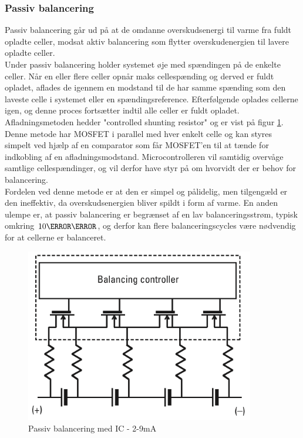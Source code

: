 \subsubsection{Passiv balancering}
Passiv balancering går ud på at de omdanne overskudsenergi til varme fra fuldt opladte celler, modsat aktiv balancering som flytter overskudenergien til lavere opladte celler.
\\

Under passiv balancering holder systemet øje med spændingen på de enkelte celler. Når en eller flere celler opnår maks cellespænding og derved er fuldt opladet, aflades de igennem en modstand til de har samme spænding som den laveste celle i systemet eller en spændingsreference. Efterfølgende oplades cellerne igen, og denne proces fortsætter indtil alle celler er fuldt opladet. 
\\

Afladningsmetoden hedder "controlled shunting resistor" og er vist på figur \ref{fig:passiv_balancering}. Denne metode har MOSFET i parallel med hver enkelt celle og kan styres simpelt ved hjælp af en comparator som får MOSFET'en til at tænde for indkobling af en afladningsmodstand. Microcontrolleren vil samtidig overvåge samtlige cellespændinger, og vil derfor have styr på om hvorvidt der er behov for balancering.
\\

Fordelen ved denne metode er at den er simpel og pålidelig, men tilgengæld er den ineffektiv, da overskudsenergien bliver spildt i form af varme. En anden ulempe er, at passiv balancering er  begrænset af en lav balanceringsstrøm, typisk omkring $10\milli\ampere$, og derfor kan flere balanceringscycles være nødvendig for at cellerne er balanceret.

\begin{figure}[h]
	\centering
	\includegraphics[width=10cm]{billeder/passiv_balancering.png}
	\caption{Passiv balancering med IC - 2-9mA}
	\label{fig:passiv_balancering}
\end{figure}



